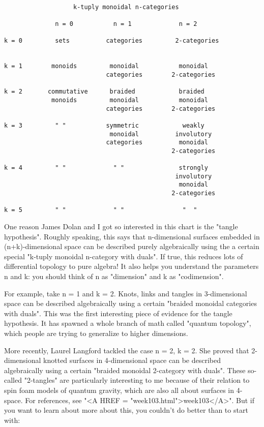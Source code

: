 \begin{verbatim}

                   k-tuply monoidal n-categories 

              n = 0           n = 1             n = 2

k = 0         sets          categories         2-categories
     

k = 1        monoids         monoidal           monoidal
                            categories        2-categories

k = 2       commutative      braided            braided
             monoids         monoidal           monoidal
                            categories        2-categories 

k = 3         " "           symmetric            weakly
                             monoidal          involutory
                            categories          monoidal
                                              2-categories

k = 4         " "             " "               strongly 
                                               involutory
                                                monoidal
                                              2-categories

k = 5         " "             " "                "  "

\end{verbatim}
    
One reason James Dolan and I got so interested in this chart is the
"tangle hypothesis".  Roughly speaking, this says that n-dimensional
surfaces embedded in (n+k)-dimensional space can be described purely
algebraically using the a certain special "k-tuply monoidal n-category
with duals".  If true, this reduces lots of differential
topology to pure algebra!  It also helps you understand the parameters
n and k: you should think of n as "dimension" 
and k as "codimension".

For example, take n = 1 and k = 2.  Knots, links and tangles in
3-dimensional space can be described algebraically using a certain
"braided monoidal categories with duals".  This was the first
interesting piece of evidence for the tangle hypothesis.  It has
spawned a whole branch of math called "quantum topology", which
people are trying to generalize to higher dimensions.

More recently, Laurel Langford tackled the case n = 2, k = 2.  She
proved that 2-dimensional knotted surfaces in 4-dimensional space can
be described algebraically using a certain "braided monoidal
2-category with duals".  These so-called "2-tangles" 
are particularly
interesting to me because of their relation to spin foam models of
quantum gravity, which are also all about surfaces in 4-space.  For
references, see "<A HREF = "week103.html">week103</A>".  But if you want to learn about more about
this, you couldn't do better than to start with:

